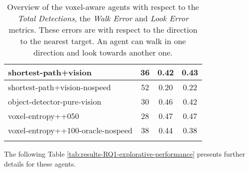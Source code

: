 \begin{longtable}{|l|c|c|c|}
shortest-path+vision & 36 & {\cellcolor[HTML]{CCE3DE}} \color[HTML]{000000} 0.42 & {\cellcolor[HTML]{D2E6E2}} \color[HTML]{000000} 0.43 \\ \hline
shortest-path+vision-nospeed & 52 & {\cellcolor[HTML]{55AA99}} \color[HTML]{000000} 0.20 & {\cellcolor[HTML]{55AA99}} \color[HTML]{000000} 0.22 \\ \hline
object-detector-pure-vision & 30 & {\cellcolor[HTML]{DEECE9}} \color[HTML]{000000} 0.46 & {\cellcolor[HTML]{C9E2DC}} \color[HTML]{000000} 0.42 \\ \hline
voxel-entropy++050 & 28 & {\cellcolor[HTML]{E3EFEC}} \color[HTML]{000000} 0.47 & {\cellcolor[HTML]{E7F0EE}} \color[HTML]{000000} 0.47 \\ \hline
voxel-entropy++100-oracle-nospeed & 38 & {\cellcolor[HTML]{D5E8E4}} \color[HTML]{000000} 0.44 & {\cellcolor[HTML]{B6D8D1}} \color[HTML]{000000} 0.38 \\ \hline

    \caption{Overview of the voxel-aware agents with respect to the \textit{Total Detections}, the \textit{Walk Error} and \textit{Look Error} metrics.
    These errors are with respect to the direction to the nearest target. An agent can walk in one direction and look towards another one.
    }
    \label{tab:results-RQ1-walkLook}
\end{longtable}

 The following Table \ref{tab:results-RQ1-explorative-performance} presents further details for these agents.
 



